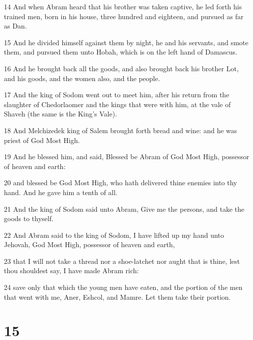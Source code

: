 \par 14 And when Abram heard that his brother was taken captive, he led forth his trained men, born in his house, three hundred and eighteen, and pursued as far as Dan.
\par 15 And he divided himself against them by night, he and his servants, and smote them, and pursued them unto Hobah, which is on the left hand of Damascus.
\par 16 And he brought back all the goods, and also brought back his brother Lot, and his goods, and the women also, and the people.
\par 17 And the king of Sodom went out to meet him, after his return from the slaughter of Chedorlaomer and the kings that were with him, at the vale of Shaveh (the same is the King's Vale).
\par 18 And Melchizedek king of Salem brought forth bread and wine: and he was priest of God Most High.
\par 19 And he blessed him, and said, Blessed be Abram of God Most High, possessor of heaven and earth:
\par 20 and blessed be God Most High, who hath delivered thine enemies into thy hand. And he gave him a tenth of all.
\par 21 And the king of Sodom said unto Abram, Give me the persons, and take the goods to thyself.
\par 22 And Abram said to the king of Sodom, I have lifted up my hand unto Jehovah, God Most High, possessor of heaven and earth,
\par 23 that I will not take a thread nor a shoe-latchet nor aught that is thine, lest thou shouldest say, I have made Abram rich:
\par 24 save only that which the young men have eaten, and the portion of the men that went with me, Aner, Eshcol, and Mamre. Let them take their portion.

\chapter{15}

